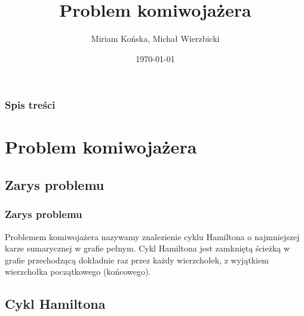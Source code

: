 \documentclass{beamer}
\title[TSP ACU]{Problem komiwojażera} %
\author{Miriam Końska, Michał Wierzbicki} %
\institute[IIUWr] %
{
University of Wrocław \\ %
\medskip
}
\date{\today} %
\begin{document}
\begin{frame}
\titlepage %
\end{frame}

\begin{frame}
\frametitle{Spis treści} %
\tableofcontents %
\end{frame}


\section{Problem komiwojażera} %

\subsection{Zarys problemu} %


\begin{frame}
\frametitle{Zarys problemu}
Problemem komiwojażera nazywamy znalezienie cyklu Hamiltona o najmniejszej karze sumarycznej w grafie pełnym.
Cykl Hamiltona jest zamkniętą ścieżką w grafie przechodzącą dokładnie raz przez każdy wierzchołek, z wyjątkiem wierzchołka początkowego (końcowego).

\end{frame}


\subsection{Cykl Hamiltona}
\end{document}
